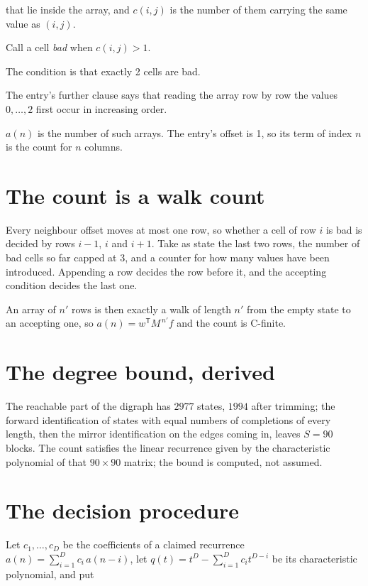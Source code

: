 \documentclass[11pt]{article}
\theoremstyle{definition}
\begin{document}
that lie inside the array, and $c(i,j)$ is the number of them carrying the same value as $(i,j)$.

Call a cell {\itshape bad} when $c(i,j) > 1$.

The condition is that exactly 2 cells are bad.

The entry's further clause says that reading the array row by row the values $0,\dots,2$ first occur in increasing order.

$a(n)$ is the number of such arrays. The entry's offset is 1, so its term of index $n$ is the count for $n$ columns.

\section{The count is a walk count}

Every neighbour offset moves at most one row, so whether a cell of row $i$ is bad is decided by rows $i-1$, $i$ and $i+1$. Take as state the last two rows, the number of bad cells so far capped at 3, and a counter for how many values have been introduced. Appending a row decides the row before it, and the accepting condition decides the last one.

An array of $n'$ rows is then exactly a walk of length $n'$ from the empty state to an accepting one, so $a(n) = w^{\mathsf T}M^{\,n'}f$ and the count is C-finite.

\section{The degree bound, derived}

The reachable part of the digraph has $2977$ states, $1994$ after trimming; the forward identification of states with equal numbers of completions of every length, then the mirror identification on the edges coming in, leaves $S = 90$ blocks. The count satisfies the linear recurrence given by the characteristic polynomial of that $90\times90$ matrix; the bound is computed, not assumed.

\section{The decision procedure}

Let $c_1,\dots,c_D$ be the coefficients of a claimed recurrence $a(n) = \sum_{i=1}^{D} c_i\,a(n-i)$, let $q(t) = t^{D} - \sum_{i=1}^{D} c_i t^{D-i}$ be its characteristic polynomial, and put
\end{document}
